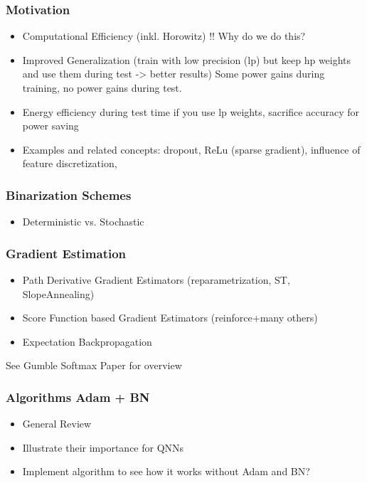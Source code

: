 \documentclass{article}
\begin{document}

\subsubsection*{Motivation}
    \begin{itemize}
        \item Computational Efficiency (inkl. Horowitz) !! Why do we do this?
        \item Improved Generalization (train with low precision (lp) but keep hp weights and use them during test -> better results) Some power gains during training, no power gains during test.
        \item Energy efficiency during test time if you use lp weights, sacrifice accuracy for power saving
        \item Examples and related concepts: dropout, ReLu (sparse gradient),
        influence of feature discretization, 
    \end{itemize}


\subsubsection*{Binarization Schemes}
    \begin{itemize}
        \item Deterministic vs. Stochastic
    \end{itemize}


\subsubsection*{Gradient Estimation}
    \begin{itemize}
        \item Path Derivative Gradient Estimators (reparametrization, ST,
        SlopeAnnealing)
        \item Score Function based Gradient Estimators (reinforce+many others)
        \item Expectation Backpropagation
    \end{itemize}
    See Gumble Softmax Paper for overview

\subsubsection*{Algorithms Adam + BN}
    \begin{itemize}
        \item General Review
        \item Illustrate their importance for QNNs
        \item Implement algorithm to see how it works without Adam and BN?
    \end{itemize}
\end{document}
